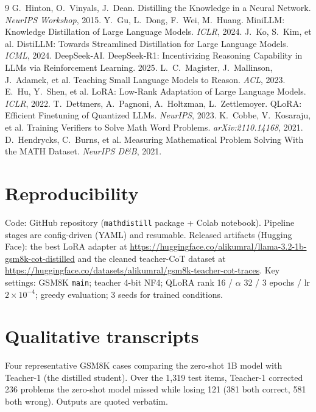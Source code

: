 \documentclass[11pt]{article}
\begin{document}
\begin{thebibliography}{9}
 G.~Hinton, O.~Vinyals, J.~Dean. Distilling the Knowledge in a Neural Network. \emph{NeurIPS Workshop}, 2015.
 Y.~Gu, L.~Dong, F.~Wei, M.~Huang. MiniLLM: Knowledge Distillation of Large Language Models. \emph{ICLR}, 2024.
 J.~Ko, S.~Kim, et al. DistiLLM: Towards Streamlined Distillation for Large Language Models. \emph{ICML}, 2024.
 DeepSeek-AI. DeepSeek-R1: Incentivizing Reasoning Capability in LLMs via Reinforcement Learning. 2025.
 L.~C.~Magister, J.~Mallinson, J.~Adamek, et al. Teaching Small Language Models to Reason. \emph{ACL}, 2023.
 E.~Hu, Y.~Shen, et al. LoRA: Low-Rank Adaptation of Large Language Models. \emph{ICLR}, 2022.
 T.~Dettmers, A.~Pagnoni, A.~Holtzman, L.~Zettlemoyer. QLoRA: Efficient Finetuning of Quantized LLMs. \emph{NeurIPS}, 2023.
 K.~Cobbe, V.~Kosaraju, et al. Training Verifiers to Solve Math Word Problems. \emph{arXiv:2110.14168}, 2021.
 D.~Hendrycks, C.~Burns, et al. Measuring Mathematical Problem Solving With the MATH Dataset. \emph{NeurIPS D\&B}, 2021.
\end{thebibliography}

\appendix
\section{Reproducibility}
Code: GitHub repository (\texttt{mathdistill} package + Colab notebook). Pipeline
stages are config-driven (YAML) and resumable. Released artifacts (Hugging Face):
the best LoRA adapter at
\url{https://huggingface.co/alikumral/llama-3.2-1b-gsm8k-cot-distilled} and the
cleaned teacher-CoT dataset at
\url{https://huggingface.co/datasets/alikumral/gsm8k-teacher-cot-traces}.
Key settings: GSM8K \texttt{main}; teacher 4-bit NF4; QLoRA rank 16 / $\alpha$ 32 /
3 epochs / lr $2\times10^{-4}$; greedy evaluation; 3 seeds for trained conditions.

\section{Qualitative transcripts}
\label{app:qual}
Four representative GSM8K cases comparing the zero-shot 1B model with Teacher-1
(the distilled student). Over the 1{,}319 test items, Teacher-1 corrected 236
problems the zero-shot model missed while losing 121 (381 both correct, 581 both
wrong). Outputs are quoted verbatim.
\end{document}

